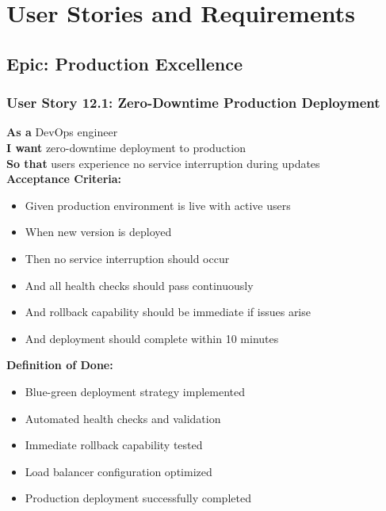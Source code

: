\section{User Stories and Requirements}

\subsection{Epic: Production Excellence}

\subsubsection{User Story 12.1: Zero-Downtime Production Deployment}

\begin{tcolorbox}[colback=lightgray, colframe=primaryblue, title=US-12.1: Zero-Downtime Production Deployment]
\textbf{As a} DevOps engineer \\
\textbf{I want} zero-downtime deployment to production \\
\textbf{So that} users experience no service interruption during updates \\

\textbf{Acceptance Criteria:}
\begin{itemize}
    \item Given production environment is live with active users
    \item When new version is deployed
    \item Then no service interruption should occur
    \item And all health checks should pass continuously
    \item And rollback capability should be immediate if issues arise
    \item And deployment should complete within 10 minutes
\end{itemize}

\textbf{Definition of Done:}
\begin{itemize}
    \item Blue-green deployment strategy implemented
    \item Automated health checks and validation
    \item Immediate rollback capability tested
    \item Load balancer configuration optimized
    \item Production deployment successfully completed
\end{itemize}
\end{tcolorbox}

